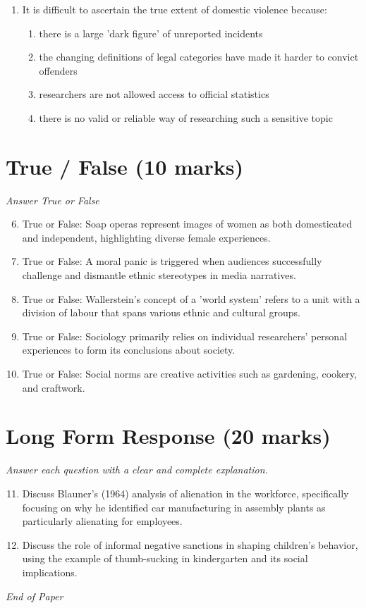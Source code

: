 \documentclass[12pt]{article}
\begin{document}
\begin{enumerate}[label=\arabic*.]
\begin{enumerate}[label=(\alph*)]
    \item women's criminal behaviour tended to reflect traditional gender roles
    \item all of the above
\end{enumerate}
\item It is difficult to ascertain the true extent of domestic violence because:
\begin{enumerate}[label=(\alph*)]
    \item there is a large 'dark figure' of unreported incidents
    \item the changing definitions of legal categories have made it harder to convict offenders
    \item researchers are not allowed access to official statistics
    \item there is no valid or reliable way of researching such a sensitive topic
\end{enumerate}
\end{enumerate}

\section*{True / False (10 marks)}
\textit{Answer True or False}
\begin{enumerate}[label=\arabic*.]
\setcounter{enumi}{5}
\item True or False: Soap operas represent images of women as both domesticated and independent, highlighting diverse female experiences.
\item True or False: A moral panic is triggered when audiences successfully challenge and dismantle ethnic stereotypes in media narratives.
\item True or False: Wallerstein's concept of a 'world system' refers to a unit with a division of labour that spans various ethnic and cultural groups.
\item True or False: Sociology primarily relies on individual researchers' personal experiences to form its conclusions about society.
\item True or False: Social norms are creative activities such as gardening, cookery, and craftwork.
\end{enumerate}

\section*{Long Form Response (20 marks)}
\textit{Answer each question with a clear and complete explanation.}
\begin{enumerate}[label=\arabic*.]
\setcounter{enumi}{10}
\item Discuss Blauner's (1964) analysis of alienation in the workforce, specifically focusing on why he identified car manufacturing in assembly plants as particularly alienating for employees.
\item Discuss the role of informal negative sanctions in shaping children's behavior, using the example of thumb-sucking in kindergarten and its social implications.
\end{enumerate}

\vfill
\noindent\textit{End of Paper}
\end{document}
